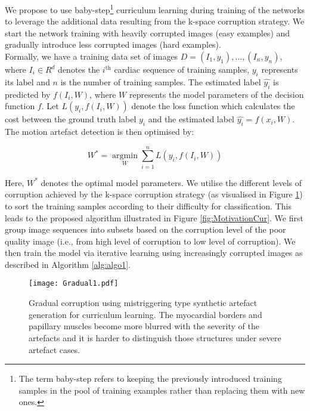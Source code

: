 \documentclass[preprint,12pt,authoryear]{elsarticle}
\begin{document}
We propose to use baby-step\footnote{The term baby-step refers to keeping the previously introduced training samples in the pool of training examples rather than replacing them with new ones.} curriculum learning during training of the networks to leverage the additional data resulting from the k-space corruption strategy. We start the network training with heavily corrupted images (easy examples) and gradually introduce less corrupted images (hard examples). \\

Formally, we have a training data set of images $D={(I_{1},y_{1}), \dots, (I_{n},y_{n})} $, where $I_{i} \in R^{d}$ denotes the $i^{\text{th}}$ cardiac sequence of training samples, $y_{i}$ represents its label and $n$ is the number of training samples. The estimated label $\hat{y_{i}}$  is predicted by $f(I_{i},W)$, where $W$ represents the model parameters of the decision function $f$. Let $L(y_{i}, f(I_{i}, W))$ denote the loss function which calculates the cost between the ground truth label $y_{i}$ and the estimated label $\hat{y_{i}}=f(x_{i},W)$. The motion artefact detection is then optimised by:

$$ W^{*}= \underset{W}{\operatorname{argmin}} \sum_{i=1}^n L(y_{i}, f(I_{i}, W)) $$

Here, $W^{*}$ denotes the optimal model parameters. We utilise the different levels of corruption achieved by the k-space corruption strategy (as visualised in Figure \ref{fig:Gradual}) to sort the training samples according to their difficulty for classification.  This leads to the proposed algorithm illustrated in Figure \ref{fig:MotivationCur}. We first group image sequences into subsets based on the corruption level of the poor quality image (i.e., from high level of corruption to low level of corruption). We then train the model via iterative learning using increasingly corrupted images as described in Algorithm \ref{alg:algo1}.

 \begin{figure}[tb]
  \centering
  \centerline{\texttt{[image: Gradual1.pdf]}}
\caption{Gradual corruption using mistriggering type synthetic artefact generation for curriculum learning. The myocardial borders and papillary muscles become more blurred with the severity of the artefacts and it is harder to distinguish those structures under severe artefact cases.}
\label{fig:Gradual}
\end{figure}
\end{document}
